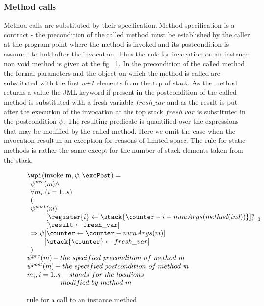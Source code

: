 \subsubsection{Method calls}
Method calls are substituted by their specification. Method specification is a contract - the precondition of the called method
must be established by the caller at the program point where the method is invoked and its postcondition is assumed to hold after the invocation. Thus the rule for
invocation on an instance non void method is given at the fig ~\ref{wpInv}. In the precondition of the called method the formal parameters and the object on which the method is called are substituted with the first \textit{n+1} elements from the top of stack. As the method returns a value the JML keyword 
 if present in the postcondition of the called method is substituted with a fresh variable $fresh\_var$ and as the result is put after the execution of the invocation at the top stack $fresh\_var$ is substituted in the postcondition $\psi$. The resulting predicate is quantified over the 
expressions that may be modified by the called method. Here we omit the case when the invocation result in an exception for reasons of limited space. 
The rule for static methods is rather the same except for the number of stack elements taken from the stack.  

\begin{figure}[!ht]
$$
\begin{array}{l}
\wpi(\rm{invoke} \ m, \psi ,\excPost) =\\ 
\begin{array}{l}
\psi^{pre}(m) \wedge \\
 \forall m_{i}. ( i = 1 .. s ) \\
 ( \\
\psi^{post}(m) \\
\phantom{\psi^{post}}[\register{i}  \leftarrow \stack{\counter - i + numArgs(method(ind) ) } ]_{i=0}^n  \\
\phantom{\psi^{post}} [\tt{\backslash result} \leftarrow fresh\_var] \\
\Rightarrow \psi[\counter \leftarrow \counter - numArgs(m)]\\
\phantom{\Rightarrow \psi} [\stack{\counter }  \leftarrow fresh\_var] \\
) \\
\end{array} \\
\psi^{pre}(m) - the \ specified \ precondition \ of \ method \ m \\
\psi^{post}(m) - the \ specified \ postcondition \ of \ method \ m \\
m_{i} , i = 1 .. s - stands  \ for \ the \ locations \\
\phantom{m_{i} , i = 1 .. s   } modified \ by \ method \ m
\end{array}
$$
\caption{\wpi \ rule for a call to an instance method}
\label{wpInv}
\end{figure}
